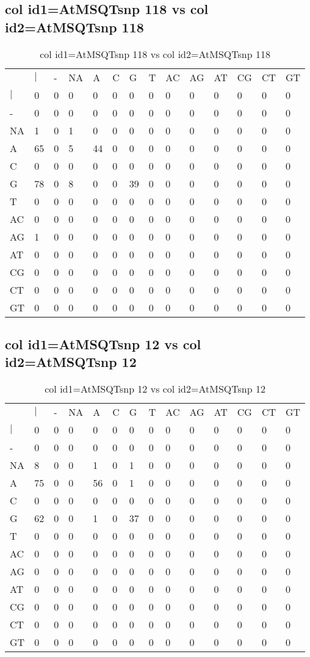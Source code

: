 \subsection{col id1=AtMSQTsnp 118 vs col id2=AtMSQTsnp 118}
\begin{center}
\begin{longtable}{|l|l|l|l|l|l|l|l|l|l|l|l|l|l|}
\caption{col id1=AtMSQTsnp 118 vs col id2=AtMSQTsnp 118} \label{table_dm500}\\
\hline
\\
\hline
&$|$&-&NA&A&C&G&T&AC&AG&AT&CG&CT&GT\\
$|$&0&0&0&0&0&0&0&0&0&0&0&0&0\\
-&0&0&0&0&0&0&0&0&0&0&0&0&0\\
NA&1&0&1&0&0&0&0&0&0&0&0&0&0\\
A&65&0&5&44&0&0&0&0&0&0&0&0&0\\
C&0&0&0&0&0&0&0&0&0&0&0&0&0\\
G&78&0&8&0&0&39&0&0&0&0&0&0&0\\
T&0&0&0&0&0&0&0&0&0&0&0&0&0\\
AC&0&0&0&0&0&0&0&0&0&0&0&0&0\\
AG&1&0&0&0&0&0&0&0&0&0&0&0&0\\
AT&0&0&0&0&0&0&0&0&0&0&0&0&0\\
CG&0&0&0&0&0&0&0&0&0&0&0&0&0\\
CT&0&0&0&0&0&0&0&0&0&0&0&0&0\\
GT&0&0&0&0&0&0&0&0&0&0&0&0&0\\
\hline
\end{longtable}
\end{center}

\subsection{col id1=AtMSQTsnp 12 vs col id2=AtMSQTsnp 12}
\begin{center}
\begin{longtable}{|l|l|l|l|l|l|l|l|l|l|l|l|l|l|}
\caption{col id1=AtMSQTsnp 12 vs col id2=AtMSQTsnp 12} \label{table_dm502}\\
\hline
\\
\hline
&$|$&-&NA&A&C&G&T&AC&AG&AT&CG&CT&GT\\
$|$&0&0&0&0&0&0&0&0&0&0&0&0&0\\
-&0&0&0&0&0&0&0&0&0&0&0&0&0\\
NA&8&0&0&1&0&1&0&0&0&0&0&0&0\\
A&75&0&0&56&0&1&0&0&0&0&0&0&0\\
C&0&0&0&0&0&0&0&0&0&0&0&0&0\\
G&62&0&0&1&0&37&0&0&0&0&0&0&0\\
T&0&0&0&0&0&0&0&0&0&0&0&0&0\\
AC&0&0&0&0&0&0&0&0&0&0&0&0&0\\
AG&0&0&0&0&0&0&0&0&0&0&0&0&0\\
AT&0&0&0&0&0&0&0&0&0&0&0&0&0\\
CG&0&0&0&0&0&0&0&0&0&0&0&0&0\\
CT&0&0&0&0&0&0&0&0&0&0&0&0&0\\
GT&0&0&0&0&0&0&0&0&0&0&0&0&0\\
\hline
\end{longtable}
\end{center}

